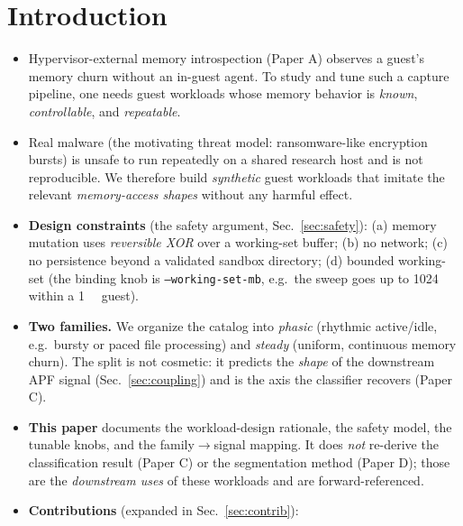 \documentclass[conference]{IEEEtran}
\begin{document}
\section{Introduction}
\begin{itemize}
  \item Hypervisor-external memory introspection (Paper A) observes a guest's
        memory churn without an in-guest agent. To study and tune such a
        capture pipeline, one needs guest workloads whose memory behavior is
        \emph{known}, \emph{controllable}, and \emph{repeatable}.
  \item Real malware (the motivating threat model:
        ransomware-like encryption bursts) is unsafe to run repeatedly on a
        shared research host and is not reproducible. We therefore build
        \emph{synthetic} guest workloads that imitate the relevant
        \emph{memory-access shapes} without any harmful effect.
  \item \textbf{Design constraints} (the safety argument, Sec.~\ref{sec:safety}):
        (a) memory mutation uses \emph{reversible XOR} over a working-set
        buffer; (b) no network; (c) no persistence beyond a validated sandbox
        directory; (d) bounded working-set (the binding knob is
        \texttt{--working-set-mb}, e.g.\ the sweep goes up to \SI{1024}{\mebi\byte}
        within a \SI{1}{\gibi\byte} guest).
  \item \textbf{Two families.} We organize the catalog into \emph{phasic}
        (rhythmic active/idle, e.g.\ bursty or paced file processing) and
        \emph{steady} (uniform, continuous memory churn). The split is not
        cosmetic: it predicts the \emph{shape} of the downstream APF signal
        (Sec.~\ref{sec:coupling}) and is the axis the classifier recovers
        (Paper C).
  \item \textbf{This paper} documents the workload-design rationale, the safety
        model, the tunable knobs, and the family$\to$signal mapping. It does
        \emph{not} re-derive the classification result (Paper C) or the
        segmentation method (Paper D); those are the \emph{downstream uses} of
        these workloads and are forward-referenced.
  \item \textbf{Contributions} (expanded in Sec.~\ref{sec:contrib}):

\end{itemize}
\end{document}

